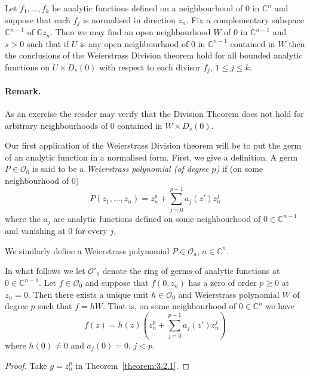  Let $f_1,\ldots,f_k$ be analytic functions defined on a neighbourhood of $0$ in $\mathbb C^n$ and suppose that each $f_j$ is normalised in direction $z_n$. Fix a complementary subspace $\mathbb C^{n-1}$ of $\mathbb Cz_n$. Then we may
find an open neighbourhood $W$ of $0$ in $\mathbb C^{n-1}$ and $s>0$ such that if $U$ is any open neighbourhood of $0$ in $\mathbb C^{n-1}$ contained in $W$ then the conclusions of the Weierstrass Division theorem hold for all bounded analytic functions on $U\times D_s(0)$ with respect to each divisor $f_j$, $1\leq j\leq k$.
\paragraph*{Remark.} As an exercise the reader may verify that the Division Theorem does not hold for arbitrary neighbourhoods of $0$ contained in $W\times D_s(0)$.

Our first application of the Weierstrass Division theorem will be to put the germ of an analytic function in a normalised form. First, we give a definition.
 A germ $P\in\mathcal O_0$ is said to be a \emph{Weierstrass polynomial (of degree $p$)} if (on some neighbourhood of $0$)
\[P(z_1,\ldots,z_n)=z_n^p+\sum_{j=0}^{p-1}a_j(z')z_n^j\]
where the $a_j$ are analytic functions defined on some neighbourhood of $0\in\mathbb C^{n-1}$ and vanishing at $0$ for every $j$.

We similarly define a Weierstrass polynomial $P\in\mathcal O_a$, $a\in\mathbb C^n$.

In what follows we let $\mathcal O'_0$ denote the ring of germs of analytic functions at $0\in\mathbb C^{n-1}$.
Let $f\in\mathcal O_0$ and suppose that $f(0,z_n)$ has a zero of order $p\geq0$ at $z_n=0$. Then there exists a unique unit $h\in\mathcal O_0$ and Weierstrass polynomial $W$ of degree $p$ such that $f=hW$. That is, on some neighbourhood of $0\in\mathbb C^n$ we have
\[f(z)=h(z)\left(z_n^p+\sum_{j=0}^{p-1}a_j(z')z_n^j\right)\]
where $h(0)\ne0$ and $a_j(0)=0$, $j<p$.
\begin{proof}Take $g=z_n^p$ in Theorem~\ref{theorem:3.2.1}.\end{proof}
